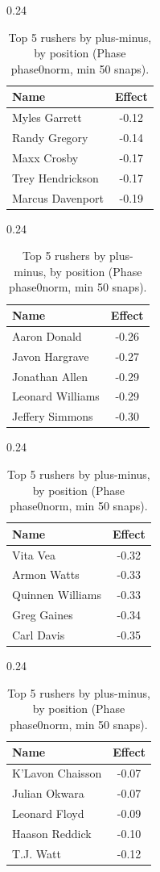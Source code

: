 \begin{table}[h!]
\centering
\begin{subtable}{0.24\textwidth}
\centering
\footnotesize
\begin{tabular}{lc}
\toprule
Name & Effect \\
\midrule
Myles Garrett & -0.12 \\
Randy Gregory & -0.14 \\
Maxx Crosby & -0.17 \\
Trey Hendrickson & -0.17 \\
Marcus Davenport & -0.19 \\
\bottomrule
\end{tabular}
\caption{DE}
\end{subtable}
\hfill
\begin{subtable}{0.24\textwidth}
\centering
\footnotesize
\begin{tabular}{lc}
\toprule
Name & Effect \\
\midrule
Aaron Donald & -0.26 \\
Javon Hargrave & -0.27 \\
Jonathan Allen & -0.29 \\
Leonard Williams & -0.29 \\
Jeffery Simmons & -0.30 \\
\bottomrule
\end{tabular}
\caption{DT}
\end{subtable}
\hfill
\begin{subtable}{0.24\textwidth}
\centering
\footnotesize
\begin{tabular}{lc}
\toprule
Name & Effect \\
\midrule
Vita Vea & -0.32 \\
Armon Watts & -0.33 \\
Quinnen Williams & -0.33 \\
Greg Gaines & -0.34 \\
Carl Davis & -0.35 \\
\bottomrule
\end{tabular}
\caption{NT}
\end{subtable}
\hfill
\begin{subtable}{0.24\textwidth}
\centering
\footnotesize
\begin{tabular}{lc}
\toprule
Name & Effect \\
\midrule
K'Lavon Chaisson & -0.07 \\
Julian Okwara & -0.07 \\
Leonard Floyd & -0.09 \\
Haason Reddick & -0.10 \\
T.J. Watt & -0.12 \\
\bottomrule
\end{tabular}
\caption{OLB}
\end{subtable}
\caption{Top 5 rushers by plus-minus, by position (Phase phase0norm, min 50 snaps).}
\label{tab:rusher_pm_phase0norm_top}
\end{table}

